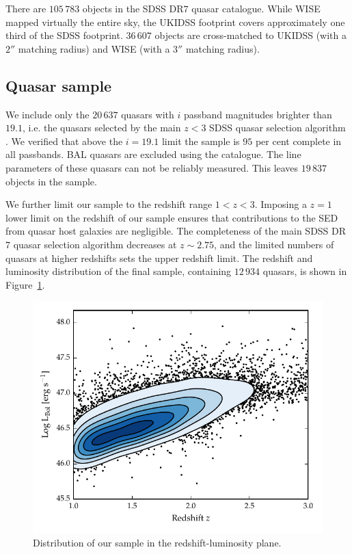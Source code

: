 There are $105\,783$ objects in the SDSS DR$7$ quasar catalogue. 
While WISE mapped virtually the entire sky, the UKIDSS footprint covers approximately one third of the SDSS footprint. 
$36\,607$ objects are cross-matched to UKIDSS (with a $2''$ matching radius) and WISE (with a $3$$''$ matching radius).

\subsection{Quasar sample}

We include only the $20\,637$ quasars with $i$ passband magnitudes brighter than $19.1$, i.e. the quasars selected by the main $z<3$ SDSS quasar selection algorithm \citep{richards02}. 
We verified that above the $i=19.1$ limit the sample is $95$ per cent complete in all passbands.
BAL quasars are excluded using the \citet{allen11} catalogue.
The  line parameters of these quasars can not be reliably measured.
This leaves $19\,837$  objects in the sample. 

We further limit our sample to the redshift range $1 < z < 3$. 
Imposing a $z=1$ lower limit on the redshift of our sample ensures that contributions to the SED from quasar host galaxies are negligible.
The completeness of the main SDSS DR$7$ quasar selection algorithm decreases at $z\sim2.75$, and the limited numbers of quasars at higher redshifts sets the upper redshift limit. 
The redshift and luminosity distribution of the final sample, containing $12\,934$ quasars, is shown in Figure~\ref{fig:lum_z}. 

\begin{figure}
  \centering
  \includegraphics[width=\textwidth]{figures/chapter05/lum_z.pdf}
  \caption[{Distribution of our sample in the redshift-luminosity plane.}]{Distribution of our sample in the redshift-luminosity plane.}
  \label{fig:lum_z}
\end{figure}

